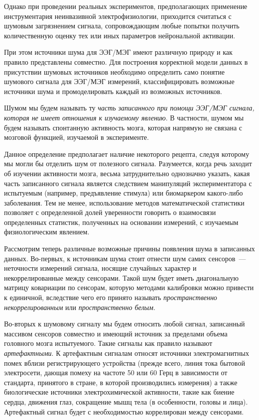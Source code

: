 Однако при проведении реальных экспериментов, предполагающих применение инструментария неинвазивной электрофизиологии,
приходится считаться с шумовым загрязнением сигнала, сопровождающим любые попытки получить количественную оценку тех
или иных параметров нейрональной активации.

При этом источники шума для ЭЭГ/МЭГ имеют различную природу и как правило представлены совместно.
Для построения корректной модели данных в присутствии шумовых источников необходимо определить
само понятие шумового сигнала для ЭЭГ/МЭГ измерений, классифицировать возможные источники шума и
промоделировать каждый из возможных источников.

Шумом мы будем называть ту
\emph{часть записанного при помощи ЭЭГ/МЭГ сигнала, которая не имеет отношения к изучаемому явлению}.
В частности, шумом мы будем называть спонтанную активность мозга, которая напрямую не связана с мозговой
функцией, изучаемой в эксперименте.

Данное определение предполагает наличие некоторого рецепта,
следуя которому мы могли бы отделить шум от полезного сигнала.
Разумеется, когда речь заходит об изучении активности мозга, весьма затруднительно однозначно указать,
какая часть записанного сигнала является следствием манипуляций экспериментатора с испытуемым
(например, предъявление стимула) или биомаркером какого-либо заболевания.
Тем не менее, использование методов математической статистики позволяет с определенной
долей уверенности говорить о взаимосвязи определенных статистик, полученных на основании
измерений, с изучаемым физиологическим явлением.

Рассмотрим теперь различные возможные причины появления шума в записанных данных.
Во-первых, к источникам шума стоит отнести шум самих сенсоров~--- неточности измерений сигнала,
носящие случайных характер и некоррелированные между сенсорами. Такой шум будет иметь диагональную
матрицу ковариации по сенсорам, которую методами калибровки можно привести к единичной,
вследствие чего его принято называть \emph{пространственно некоррелированным} или \emph{пространственно белым}.

Во-вторых к шумовому сигналу мы будем относить любой сигнал, записанный массивом сенсоров совместно и
имеющий источник за пределами объема головного мозга испытуемого. Такие сигналы как правило называют
\emph{артефактными}. К артефактным сигналам относят источники электромагнитных помех
вблизи регистрирующего устройства
(прежде всего, линия тока бытовой электросети,
дающая помеху на частоте 50 или 60 Герц в зависимости от стандарта,
принятого в стране, в которой производились измерения)
а также биологические источники электрохимической активности,
такие как биение сердца, движения глаз, сокращение мышц тела (в особенности, головы и лица).
Артефактный сигнал будет с необходимостью коррелирован между сенсорами.

